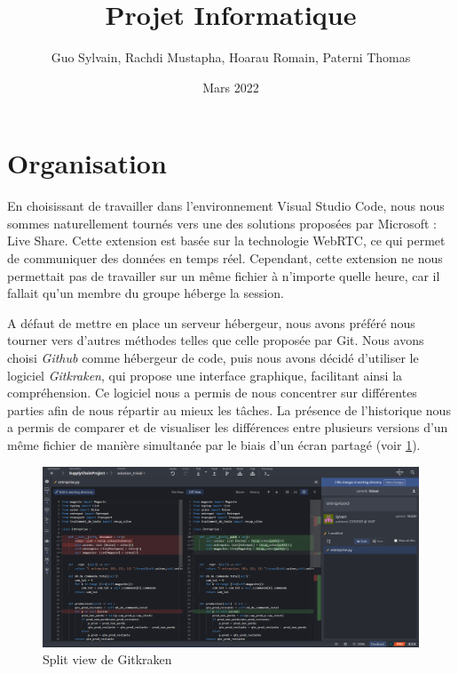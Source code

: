 \documentclass[12pt, a4paper]{article}
\title{Projet Informatique}
\author{Guo Sylvain, Rachdi Mustapha, Hoarau Romain, Paterni Thomas}
\date{Mars 2022}
\begin{document}

\maketitle
\tableofcontents
\newpage


\section{Organisation}

En choisissant de travailler dans l'environnement Visual Studio Code, nous nous sommes naturellement tournés vers une des solutions proposées par Microsoft : Live Share. Cette extension est basée sur la technologie WebRTC, ce qui permet de communiquer des données en temps réel. Cependant, cette extension ne nous permettait pas de travailler sur un même fichier à n'importe quelle heure, car il fallait qu'un membre du groupe héberge la session.

A défaut de mettre en place un serveur hébergeur, nous avons préféré nous tourner vers d'autres méthodes telles que celle proposée par Git. Nous avons choisi \emph{Github} comme hébergeur de code, puis nous avons décidé d'utiliser le logiciel \emph{Gitkraken}, qui propose une interface graphique, facilitant ainsi la compréhension. Ce logiciel nous a permis de nous concentrer sur différentes parties afin de nous répartir au mieux les tâches. La présence de l'historique nous a permis de comparer et de visualiser les différences entre plusieurs versions d'un même fichier de manière simultanée par le biais d'un écran partagé (voir \ref{fig:gitkraken}).

\begin{figure}[h] %
    \centering
    \includegraphics[width=1\textwidth]{gitkraken} %
    \caption{Split view de Gitkraken} %
    \label{fig:gitkraken} %
\end{figure}
\end{document}
